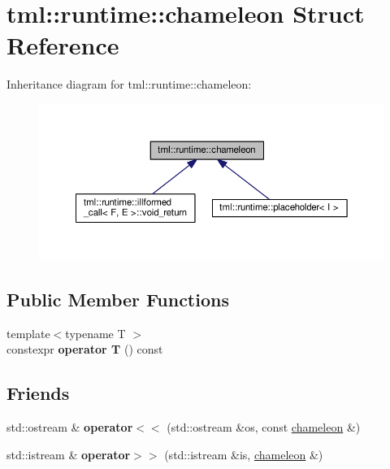 \hypertarget{structtml_1_1runtime_1_1chameleon}{\section{tml\+:\+:runtime\+:\+:chameleon Struct Reference}
\label{structtml_1_1runtime_1_1chameleon}
}


Inheritance diagram for tml\+:\+:runtime\+:\+:chameleon\+:
\nopagebreak
\begin{figure}[H]
\begin{center}
\leavevmode
\includegraphics[width=350pt]{structtml_1_1runtime_1_1chameleon__inherit__graph}
\end{center}
\end{figure}
\subsection*{Public Member Functions}
\begin{DoxyCompactItemize}
\item 
\hypertarget{structtml_1_1runtime_1_1chameleon_a400819ddd792ce377086cc7c31b76e4f}{{\footnotesize template$<$typename T $>$ }\\constexpr {\bfseries operator T} () const }\label{structtml_1_1runtime_1_1chameleon_a400819ddd792ce377086cc7c31b76e4f}

\end{DoxyCompactItemize}
\subsection*{Friends}
\begin{DoxyCompactItemize}
\item 
\hypertarget{structtml_1_1runtime_1_1chameleon_a2ca8a1edf43ca20d170d58bad3bc33ab}{std\+::ostream \& {\bfseries operator$<$$<$} (std\+::ostream \&os, const \hyperlink{structtml_1_1runtime_1_1chameleon}{chameleon} \&)}\label{structtml_1_1runtime_1_1chameleon_a2ca8a1edf43ca20d170d58bad3bc33ab}

\item 
\hypertarget{structtml_1_1runtime_1_1chameleon_ad087011c1fa873a49431e0434ae5ca64}{std\+::istream \& {\bfseries operator$>$$>$} (std\+::istream \&is, \hyperlink{structtml_1_1runtime_1_1chameleon}{chameleon} \&)}\label{structtml_1_1runtime_1_1chameleon_ad087011c1fa873a49431e0434ae5ca64}

\end{DoxyCompactItemize}


